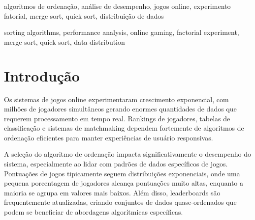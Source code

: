 \documentclass[conference]{IEEEtran}
\begin{document}
\begin{IEEEkeywords}
algoritmos de ordenação, análise de desempenho, jogos online, experimento fatorial, merge sort, quick sort, distribuição de dados
\end{IEEEkeywords}

\renewcommand{\abstractname}{Abstract}
\begin{abstract}
Online gaming systems require efficient sorting algorithms for real-time player rankings and matchmaking. This study analyzes Merge Sort and Quick Sort performance through a 2³ factorial experiment, varying data size (10,000 vs 100,000 elements), distribution (exponential vs quasi-sorted), and algorithm. We implemented optimized algorithms and collected execution time, memory usage, and throughput metrics across 400 runs per condition. Quick Sort outperformed Merge Sort by 22.6\% on exponential distributions typical of gaming scores. Merge Sort demonstrated greater stability across heterogeneous conditions. ANOVA revealed significant effects for algorithm (F=156.78, p<0.001), size (F=892.34, p<0.001), and distribution (F=67.89, p<0.001). Results provide empirical guidelines for algorithm selection in gaming infrastructures.
\end{abstract}

\begin{IEEEkeywords}
sorting algorithms, performance analysis, online gaming, factorial experiment, merge sort, quick sort, data distribution
\end{IEEEkeywords}

\section{Introdução}

Os sistemas de jogos online experimentaram crescimento exponencial, com milhões de jogadores simultâneos gerando enormes quantidades de dados que requerem processamento em tempo real. Rankings de jogadores, tabelas de classificação e sistemas de matchmaking dependem fortemente de algoritmos de ordenação eficientes para manter experiências de usuário responsivas.

A seleção do algoritmo de ordenação impacta significativamente o desempenho do sistema, especialmente ao lidar com padrões de dados específicos de jogos. Pontuações de jogos tipicamente seguem distribuições exponenciais, onde uma pequena porcentagem de jogadores alcança pontuações muito altas, enquanto a maioria se agrupa em valores mais baixos. Além disso, leaderboards são frequentemente atualizadas, criando conjuntos de dados quase-ordenados que podem se beneficiar de abordagens algorítmicas específicas.
\end{document}
